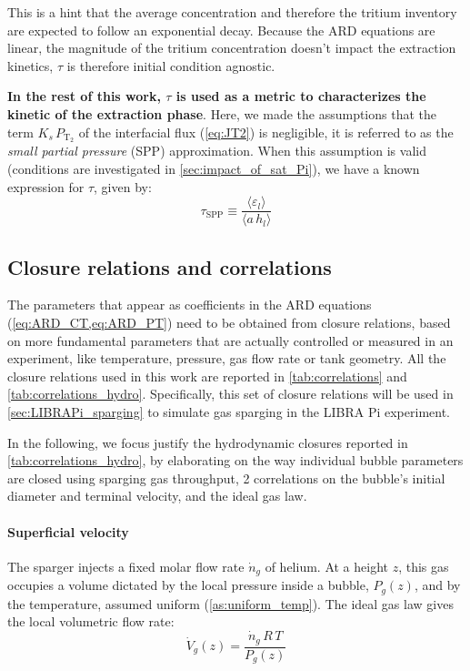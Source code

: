 \documentclass[a4paper,11pt,oneside]{report}
\newcommand{\PT}{\ensuremath{P_\mathrm{T_2}}}
\newcounter{assumption}[chapter]
\begin{document}
This is a hint that the average concentration and therefore the tritium inventory are expected to follow an exponential decay. Because the ARD equations are linear, the magnitude of the tritium concentration doesn't impact the extraction kinetics, $\tau$ is therefore initial condition agnostic. 

\textbf{In the rest of this work, $\tau$ is used as a metric to characterizes the kinetic of the extraction phase}. Here, we made the assumptions that the term $K_s\,\PT$ of the interfacial flux (\cref{eq:JT2}) is negligible, it is referred to as the \textit{small partial pressure} (SPP) approximation. When this assumption is valid (conditions are investigated in \cref{sec:impact_of_sat_Pi}), we have a known expression for $\tau$, given by:
\begin{equation}
    \boxed{\tau_\mathrm{SPP}\equiv\frac{\langle \varepsilon_l \rangle}{\langle a\,h_l\rangle}}
    \label{eq:tau_SPP}
\end{equation}

\subsection{Closure relations and correlations}



The parameters that appear as coefficients in the ARD equations (\cref{eq:ARD_CT,eq:ARD_PT}) need to be obtained from closure relations, based on more fundamental parameters that are actually controlled or measured in an experiment, like temperature, pressure, gas flow rate or tank geometry. 
All the closure relations used in this work are reported in \cref{tab:correlations} and \cref{tab:correlations_hydro}. Specifically, this set of closure relations will be used in \cref{sec:LIBRAPi_sparging} to simulate gas sparging in the LIBRA Pi experiment. 

In the following, we focus justify the hydrodynamic closures reported in \cref{tab:correlations_hydro}, by elaborating on the way individual bubble parameters are closed using sparging gas throughput, 2 correlations on the bubble's initial diameter and terminal velocity, and the ideal gas law.

\paragraph{Superficial velocity}

The sparger injects a fixed molar flow rate $\dot n_g$ of helium. At a height $z$, this gas occupies a volume dictated by the local pressure inside a bubble, $P_g(z)$, and by the temperature, assumed uniform (\cref{as:uniform_temp}). The ideal gas law gives the local volumetric flow rate:
\begin{equation}
    \dot V_g(z) = \frac{\dot n_g \, R \, T}{P_g(z)}
\end{equation}
\end{document}
